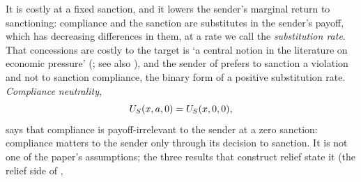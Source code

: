  It is costly at a fixed sanction, and it lowers the sender's
marginal return to sanctioning: compliance and the sanction are substitutes in the
sender's payoff, which has decreasing differences in them, at a rate we call the
\emph{substitution rate}. That concessions are costly to
the target is `a central notion in the literature on economic pressure'
(\citealp[p.~567]{Marinov2005}; see also \citealp[p.~903]{Eaton1992}), and the sender of
\citet[Assumptions~2 and~4]{Tsebelis1990} prefers to sanction a violation and not to
sanction compliance, the binary form of a positive substitution rate.
\emph{Compliance neutrality},
\begin{equation}
U_S(x,a,0)=U_S(x,0,0),
\label{eq:zero-sanction-neutrality}
\end{equation}
says that compliance is payoff-irrelevant to the sender at a zero sanction:
compliance matters to the sender only through its decision to sanction. It is not
one of the paper's assumptions; the three results that construct relief state it
(the relief side of , 
